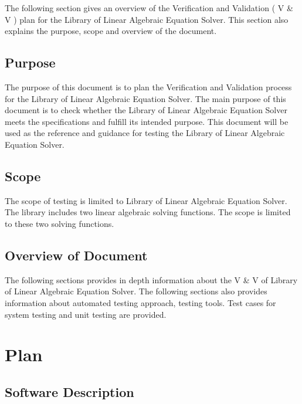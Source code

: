 \documentclass[12pt, titlepage]{article}
\begin{document}
The following section gives an overview of the Verification and Validation ( V
\& V ) plan for the Library of Linear Algebraic Equation Solver. This section
also explains the purpose, scope and overview of the document.


\subsection{Purpose}

The purpose of this document is to plan the Verification and Validation process
for the Library of Linear Algebraic Equation Solver. The main purpose of this
document is to check whether the Library of Linear Algebraic Equation Solver
meets the specifications and fulfill its intended purpose. This document will be
used as the reference and guidance for testing the Library of Linear Algebraic
Equation Solver.




\subsection{Scope}

The scope of testing is limited to Library of Linear Algebraic Equation Solver.
The library includes two linear algebraic solving functions. The scope is
limited to these two solving functions.



\subsection{Overview of Document}

The following sections provides in depth information about the V \& V of Library
of Linear Algebraic Equation Solver. The following sections also provides
information about automated testing approach, testing tools. Test cases for
system testing and unit testing are provided.

\section{Plan}
	
\subsection{Software Description}
\end{document}
